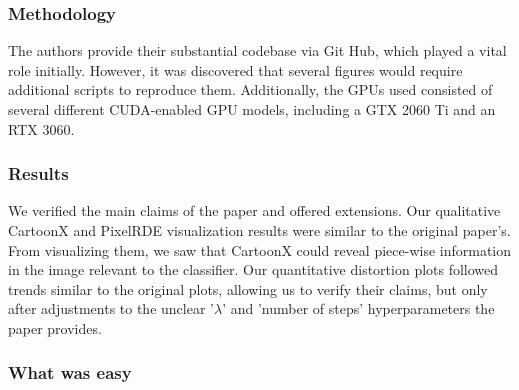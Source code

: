\subsubsection*{Methodology}


The authors provide their substantial codebase via Git Hub, which played a vital role initially. However, it was discovered that several figures would require additional scripts to reproduce them. Additionally, the GPUs used consisted of several different CUDA-enabled GPU models, including a GTX 2060 Ti and an RTX 3060.

\subsubsection*{Results}

We verified the main claims of the paper and offered extensions. Our qualitative CartoonX and PixelRDE visualization results were similar to the original paper's. From visualizing them, we saw that CartoonX could reveal piece-wise information in the image relevant to the classifier. Our quantitative distortion plots followed trends similar to the original plots, allowing us to verify their claims, but only after adjustments to the unclear '$\lambda$' and 'number of steps' hyperparameters the paper provides. 

\subsubsection*{What was easy}


